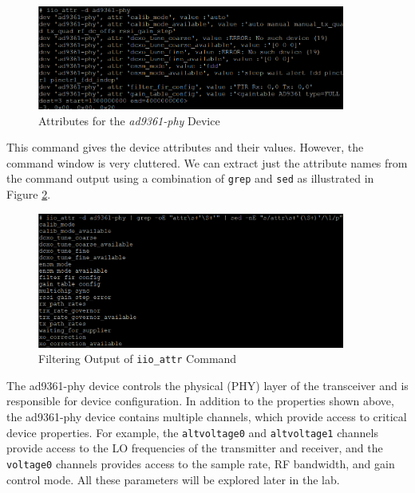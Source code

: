 \documentclass{article}
\begin{document}
\begin{figure}[H]
	\centerline{\includegraphics[width=0.9\textwidth]{iio_raw_attributes.png}}
	\caption{Attributes for the \textit{ad9361-phy} Device}
	\label{fig::iio_raw_attributes}
\end{figure}

This command gives the device attributes and their values. However, the command window is very cluttered. We can extract just the attribute names from the command output using a combination of \texttt{grep} and \texttt{sed} as illustrated in Figure \ref{fig::iio_filtered_attributes}.

\begin{figure}[H]
	\centerline{\includegraphics[width=0.9\textwidth]{iio_filtered_attributes.png}}
	\caption{Filtering Output of \texttt{iio\_attr} Command}
	\label{fig::iio_filtered_attributes}
\end{figure}

The ad9361-phy device controls the physical (PHY) layer of the transceiver and is responsible for device configuration. In addition to the properties shown above, the ad9361-phy device contains multiple channels, which provide access to critical device properties. For example, the \texttt{altvoltage0} and \texttt{altvoltage1} channels provide access to the LO frequencies of the transmitter and receiver, and the \texttt{voltage0} channels provides access to the sample rate, RF bandwidth, and gain control mode. All these parameters will be explored later in the lab.

\end{document}
